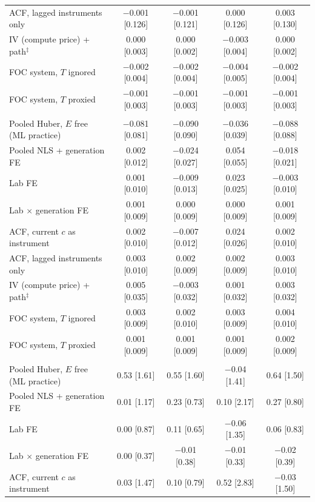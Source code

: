 \begin{table}[tp]
\begin{tabular}{@{}lcccc@{}}
ACF, lagged instruments only & $-$0.001 [0.126] & $-$0.001 [0.121] & 0.000 [0.126] & 0.003 [0.130] \\
IV (compute price) + path$^{\ddagger}$ & 0.000 [0.003] & 0.000 [0.002] & $-$0.003 [0.004] & 0.000 [0.002] \\
FOC system, $T$ ignored & $-$0.002 [0.004] & $-$0.002 [0.004] & $-$0.004 [0.005] & $-$0.002 [0.004] \\
FOC system, $T$ proxied & $-$0.001 [0.003] & $-$0.001 [0.003] & $-$0.001 [0.003] & $-$0.001 [0.003] \\
\addlinespace
\multicolumn{5}{@{}l}{\textit{Panel C. TFP growth per generation (truth 0.150)}} \\
Pooled Huber, $E$ free (ML practice) & $-$0.081 [0.081] & $-$0.090 [0.090] & $-$0.036 [0.039] & $-$0.088 [0.088] \\
Pooled NLS + generation FE & 0.002 [0.012] & $-$0.024 [0.027] & 0.054 [0.055] & $-$0.018 [0.021] \\
Lab FE & 0.001 [0.010] & $-$0.009 [0.013] & 0.023 [0.025] & $-$0.003 [0.010] \\
Lab $\times$ generation FE & 0.001 [0.009] & 0.000 [0.009] & 0.000 [0.009] & 0.001 [0.009] \\
ACF, current $c$ as instrument & 0.002 [0.010] & $-$0.007 [0.012] & 0.024 [0.026] & 0.002 [0.010] \\
ACF, lagged instruments only & 0.003 [0.010] & 0.002 [0.009] & 0.002 [0.009] & 0.003 [0.010] \\
IV (compute price) + path$^{\ddagger}$ & 0.005 [0.035] & $-$0.003 [0.032] & 0.001 [0.032] & 0.003 [0.032] \\
FOC system, $T$ ignored & 0.003 [0.009] & 0.002 [0.010] & 0.003 [0.009] & 0.004 [0.010] \\
FOC system, $T$ proxied & 0.001 [0.009] & 0.001 [0.009] & 0.001 [0.009] & 0.002 [0.009] \\
\addlinespace
\multicolumn{5}{@{}l}{\textit{Panel D. $\ln M^*(10^{24})$ (truth 2.898)}} \\
Pooled Huber, $E$ free (ML practice) & 0.53 [1.61] & 0.55 [1.60] & $-$0.04 [1.41] & 0.64 [1.50] \\
Pooled NLS + generation FE & 0.01 [1.17] & 0.23 [0.73] & 0.10 [2.17] & 0.27 [0.80] \\
Lab FE & 0.00 [0.87] & 0.11 [0.65] & $-$0.06 [1.35] & 0.06 [0.83] \\
Lab $\times$ generation FE & 0.00 [0.37] & $-$0.01 [0.38] & $-$0.01 [0.33] & $-$0.02 [0.39] \\
ACF, current $c$ as instrument & 0.03 [1.47] & 0.10 [0.79] & 0.52 [2.83] & $-$0.03 [1.50] \\

\end{tabular}
\end{table}
